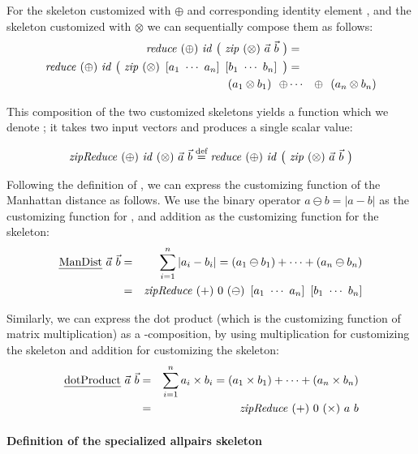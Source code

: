 For the \reduce skeleton customized with $\oplus$ and corresponding identity element \id, and the \zip skeleton customized with $\otimes$ we can sequentially compose them as follows:
\begin{eqnarray*}
  \reduce\ (\oplus)\ \id\ \big(\ \zip\ (\otimes)\ \vec{a}\ \vec{b}\ \big) &=&\\
  \reduce\ (\oplus)\ \id\ \big(\ \zip\ (\otimes)\ \DottedVector{a_1}{a_n}\ \DottedVector{b_1}{b_n}\ \big) &=&\\
  (a_1 \otimes b_1)\ \ \oplus &\cdots& \oplus\ \ (a_n \otimes b_n)
\end{eqnarray*}

This composition of the two customized skeletons yields a function which we denote \zipReduce; it takes two input vectors and produces a single scalar value:

\begin{equation*}
  \zipReduce\ (\oplus)\ \id\ (\otimes)\ \vec{a}\ \vec{b} \eqdef
  \reduce\ (\oplus)\ \id\ \big(\ \zip\ (\otimes)\ \vec{a}\ \vec{b}\ \big)
\end{equation*}

Following the definition of \zipReduce, we can express the customizing function of the Manhattan distance as follows.
We use the binary operator $a \ominus b = |a - b|$ as the customizing function for \zip, and addition as the customizing function for the \reduce skeleton:
\begin{eqnarray*}
    \ManDist\ \vec{a}\ \vec{b} &=& \sum_{i=1}^{n} | a_i - b_i | = (a_1 \ominus b_1) + \cdots + (a_n \ominus b_n)\\
    &=& \zipReduce\ (+)\ 0\ (\ominus)\ \DottedVector{a_1}{a_n}\ \DottedVector{b_1}{b_n}
\end{eqnarray*}

Similarly, we can express the dot product (which is the customizing function of matrix multiplication) as a \zip-\reduce composition, by using multiplication for customizing the \zip skeleton and addition for customizing the \reduce skeleton:
\begin{eqnarray*}
  \mbox{\emph{dotProduct}}\ \vec{a}\ \vec{b} &=& \sum_{i = 1}^{n} a_i \times b_i = (a_1 \times b_1) + \cdots + (a_n \times b_n)\\
  &=& \text{\textit{zipReduce}}\ (+)\ 0\ (\times)\ a\ b
\end{eqnarray*}

\paragraph{Definition of the specialized allpairs skeleton}

